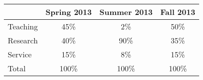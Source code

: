 \documentclass{article}
\begin{document}
\begin{center}
\begin{tabular}{lccc}
& Spring 2013 & Summer 2013 & Fall 2013 \\
\hline
Teaching & 45\% & 2\% & 50\% \\
Research & 40\% & 90\% & 35\% \\
Service & 15\% & 8\% & 15\%  \\
\hline
Total & 100\% & 100\% & 100\%
\end{tabular}
\end{center}






\end{document}
